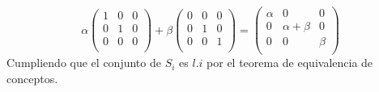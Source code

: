 \begin{enumerate}[label=\listAlph]
            \[
                \alpha
                \begin{pmatrix}
                    1 & 0 & 0 \\
                    0 & 1 & 0 \\
                    0 & 0 & 0 \\
                \end{pmatrix}
                +
                \beta
                \begin{pmatrix}
                    0 & 0 & 0 \\
                    0 & 1 & 0 \\
                    0 & 0 & 1 \\
                \end{pmatrix}
                =
                \begin{pmatrix}
                    \alpha & 0 & 0 \\
                    0 & \alpha + \beta & 0 \\
                    0 & 0 & \beta \\
                \end{pmatrix}
            \]
            Cumpliendo que el conjunto de \(S_i\) es \(l.i\) por el teorema de equivalencia de conceptos.
    \end{enumerate}
